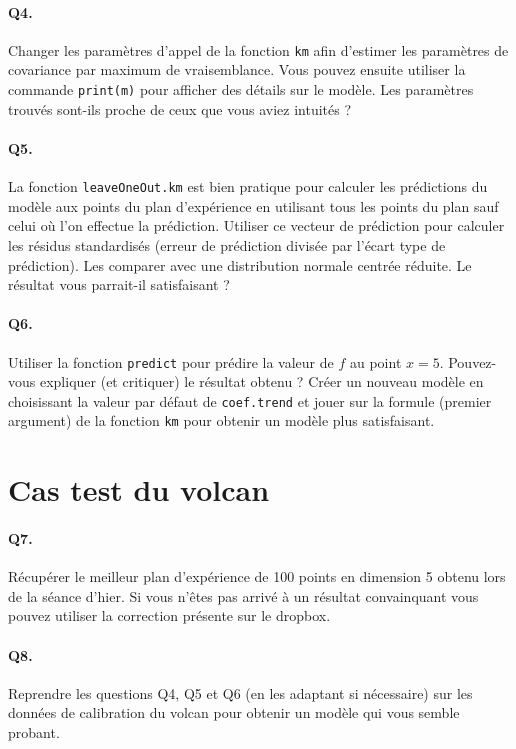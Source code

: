 \documentclass[12pt]{scrartcl}
\begin{document}
\paragraph{Q4.} Changer les paramètres d'appel de la fonction \texttt{km} afin d'estimer les paramètres de covariance par maximum de vraisemblance. Vous pouvez ensuite utiliser la commande \texttt{print(m)} pour afficher des détails sur le modèle. Les paramètres trouvés sont-ils proche de ceux que vous aviez intuités ?

\paragraph{Q5.} La fonction \texttt{leaveOneOut.km} est bien pratique pour calculer les prédictions du modèle aux points du plan d'expérience en utilisant tous les points du plan sauf celui où l'on effectue la prédiction. Utiliser ce vecteur de prédiction pour calculer les résidus standardisés (erreur de prédiction divisée par l'écart type de prédiction). Les comparer avec une distribution normale centrée réduite. Le résultat vous parrait-il satisfaisant ?  

\paragraph{Q6.} Utiliser la fonction \texttt{predict} pour prédire la valeur de $f$ au point $x=5$. Pouvez-vous expliquer (et critiquer) le résultat obtenu ? Créer un nouveau modèle en choisissant la valeur par défaut de \texttt{coef.trend} et jouer sur la formule (premier argument) de la fonction \texttt{km} pour obtenir un modèle plus satisfaisant.

\section{Cas test du volcan}

\paragraph{Q7.} Récupérer le meilleur plan d'expérience de 100 points en dimension 5 obtenu lors de la séance d'hier. Si vous n'êtes pas arrivé à un résultat convainquant vous pouvez utiliser la correction présente sur le dropbox.

\paragraph{Q8.} Reprendre les questions Q4, Q5 et Q6 (en les adaptant si nécessaire) sur les données de calibration du volcan pour obtenir un modèle qui vous semble probant.
\end{document}
